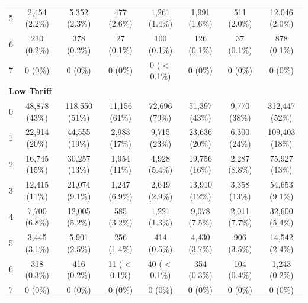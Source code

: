 \begin{table}[htbp]
\begin{tabular}{lccccccc}
5 & 2,454 (2.2\%) & 5,352 (2.3\%) & 477 (2.6\%) & 1,261 (1.4\%) & 1,991 (1.6\%) & 511 (2.0\%) & 12,046 (2.0\%) \\
6 & 210 (0.2\%) & 378 (0.2\%) & 27 (0.1\%) & 100 (0.1\%) & 126 (0.1\%) & 37 (0.1\%) & 878 (0.1\%) \\
7 & 0 (0\%) & 0 (0\%) & 0 (0\%) & 0 ($<$0.1\%) & 0 (0\%) & 0 (0\%) & 0 (0\%) \\
\hline
\multicolumn{8}{l}{\textbf{Low Tariff}} \\
0 & 48,878 (43\%) & 118,550 (51\%) & 11,156 (61\%) & 72,696 (79\%) & 51,397 (43\%) & 9,770 (38\%) & 312,447 (52\%) \\
1 & 22,914 (20\%) & 44,555 (19\%) & 2,983 (17\%) & 9,715 (23\%) & 23,636 (20\%) & 6,300 (24\%) & 109,403 (18\%) \\
2 & 16,745 (15\%) & 30,257 (13\%) & 1,954 (11\%) & 4,928 (5.4\%) & 19,756 (16\%) & 2,287 (8.8\%) & 75,927 (13\%) \\
3 & 12,415 (11\%) & 21,074 (9.1\%) & 1,247 (6.9\%) & 2,649 (2.9\%) & 13,910 (12\%) & 3,358 (13\%) & 54,653 (9.1\%) \\
4 & 7,700 (6.8\%) & 12,005 (5.2\%) & 585 (3.2\%) & 1,221 (1.3\%) & 9,078 (7.5\%) & 2,011 (7.7\%) & 32,600 (5.4\%) \\
5 & 3,445 (3.1\%) & 5,901 (2.5\%) & 256 (1.4\%) & 414 (0.5\%) & 4,430 (3.7\%) & 906 (3.5\%) & 14,542 (2.4\%) \\
6 & 318 (0.3\%) & 416 (0.2\%) & 11 ($<$0.1\%) & 40 ($<$0.1\%) & 354 (0.3\%) & 104 (0.4\%) & 1,243 (0.2\%) \\
7 & 0 (0\%) & 0 (0\%) & 0 (0\%) & 0 (0\%) & 0 (0\%) & 0 (0\%) & 0 (0\%) \\
\hline
\end{tabular}
\end{table}
